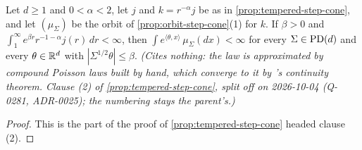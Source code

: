 \begin{proposition}
\label{prop:tempered-moments}
\leanok
Let $d \ge 1$ and $0 < \alpha < 2$, let $j$ and $k = r^{-\alpha}j$ be as in
\ref{prop:tempered-step-cone}, and let $(\mu_\Sigma)$ be the orbit of \ref{prop:orbit-step-cone}(1)
for $k$. If $\beta > 0$ and $\int_1^\infty e^{\beta r}r^{-1-\alpha}j(r)\,dr < \infty$, then
$\int e^{\langle\theta,x\rangle}\,\mu_\Sigma(dx) < \infty$ for every $\Sigma \in \mathrm{PD}(d)$ and every
$\theta \in \mathbb{R}^d$ with $|\Sigma^{1/2}\theta| \le \beta$.
\statusT\quad\emph{(Cites nothing: the law is approximated by compound Poisson laws built by hand,
which converge to it by \Levy{}'s continuity theorem. Clause (2) of \ref{prop:tempered-step-cone},
split off on 2026-10-04 (Q-0281, ADR-0025); the numbering stays the parent's.)}
\end{proposition}

\begin{proof}
\leanok
This is the part of the proof of \ref{prop:tempered-step-cone} headed clause (2).
\end{proof}

